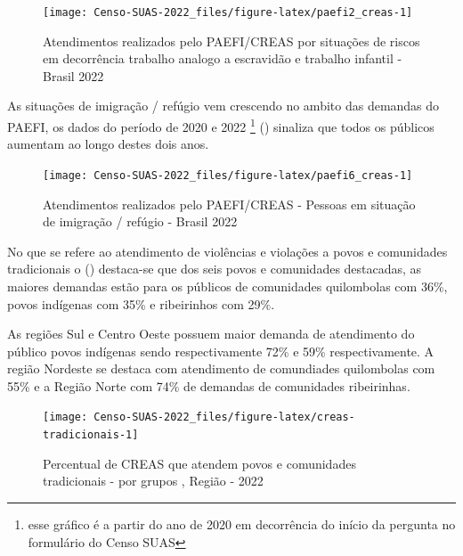 \documentclass[
  brazilian]{report}
\begin{document}
\begin{figure}
\texttt{[image: Censo-SUAS-2022\_files/figure-latex/paefi2\_creas-1]} \caption[Atendimentos realizados pelo PAEFI/CREAS por situações de riscos em decorrência trabalho analogo a escravidão e trabalho infantil - Brasil  2022]{Atendimentos realizados pelo PAEFI/CREAS por situações de riscos em decorrência trabalho analogo a escravidão e trabalho infantil - Brasil  2022}\label{fig:paefi2_creas}
\end{figure}

As situações de imigração / refúgio vem crescendo no ambito das demandas
do PAEFI, os dados do período de 2020 e 2022
\footnote{esse gráfico é a partir do ano de 2020 em decorrência do início da pergunta no formulário do Censo SUAS}
() sinaliza que todos os públicos aumentam ao
longo destes dois anos.

\begin{figure}
\texttt{[image: Censo-SUAS-2022\_files/figure-latex/paefi6\_creas-1]} \caption[Atendimentos realizados pelo PAEFI/CREAS - Pessoas em situação de imigração / refúgio - Brasil  2022]{Atendimentos realizados pelo PAEFI/CREAS - Pessoas em situação de imigração / refúgio - Brasil  2022}\label{fig:paefi6_creas}
\end{figure}

No que se refere ao atendimento de violências e violações a povos e
comunidades tradicionais o () destaca-se
que dos seis povos e comunidades destacadas, as maiores demandas estão
para os públicos de comunidades quilombolas com 36\%, povos indígenas
com 35\% e ribeirinhos com 29\%.

As regiões Sul e Centro Oeste possuem maior demanda de atendimento do
público povos indígenas sendo respectivamente 72\% e 59\%
respectivamente. A região Nordeste se destaca com atendimento de
comundiades quilombolas com 55\% e a Região Norte com 74\% de demandas
de comunidades ribeirinhas.

\begin{figure}
\texttt{[image: Censo-SUAS-2022\_files/figure-latex/creas-tradicionais-1]} \caption[Percentual de CREAS que atendem povos e comunidades tradicionais -  por grupos , Região - 2022]{Percentual de CREAS que atendem povos e comunidades tradicionais -  por grupos , Região - 2022}\label{fig:creas-tradicionais}
\end{figure}
\end{document}
